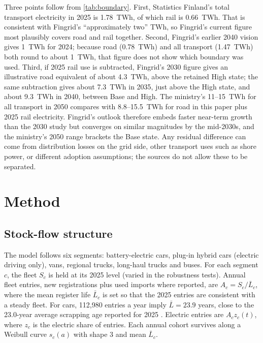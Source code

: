 \documentclass[11pt,a4paper]{article}
\begin{document}
Three points follow from \cref{tab:boundary}. First, Statistics Finland's total transport electricity in 2025 is 1.78~TWh, of which rail is 0.66~TWh. That is consistent with Fingrid's ``approximately two'' TWh, so Fingrid's current figure most plausibly covers road and rail together. Second, Fingrid's earlier 2040 vision gives 1~TWh for 2024; because road (0.78~TWh) and all transport (1.47~TWh) both round to about 1~TWh, that figure does not show which boundary was used. Third, if 2025 rail use is subtracted, Fingrid's 2030 figure gives an illustrative road equivalent of about 4.3~TWh, above the retained High state; the same subtraction gives about 7.3~TWh in 2035, just above the High state, and about 9.3~TWh in 2040, between Base and High. The ministry's 11--15~TWh for all transport in 2050 compares with 8.8--15.5~TWh for road in this paper plus 2025 rail electricity. Fingrid's outlook therefore embeds faster near-term growth than the 2030 study but converges on similar magnitudes by the mid-2030s, and the ministry's 2050 range brackets the Base state. Any residual difference can come from distribution losses on the grid side, other transport uses such as shore power, or different adoption assumptions; the sources do not allow these to be separated.

\section{Method}\label{sec:model}
\subsection{Stock-flow structure}
The model follows six segments: battery-electric cars, plug-in hybrid cars (electric driving only), vans, regional trucks, long-haul trucks and buses. For each segment $c$, the fleet $S_c$ is held at its 2025 level (varied in the robustness tests). Annual fleet entries, new registrations plus used imports where reported, are $A_c=S_c/\bar L_c$, where the mean register life $\bar L_c$ is set so that the 2025 entries are consistent with a steady fleet. For cars, 112,980 entries a year imply $\bar L=23.9$ years, close to the 23.0-year average scrapping age reported for 2025 \citep{aut2026review}. Electric entries are $A_c z_c(t)$, where $z_c$ is the electric share of entries. Each annual cohort survives along a Weibull curve $s_c(a)$ with shape 3 and mean $\bar L_c$.
\end{document}
